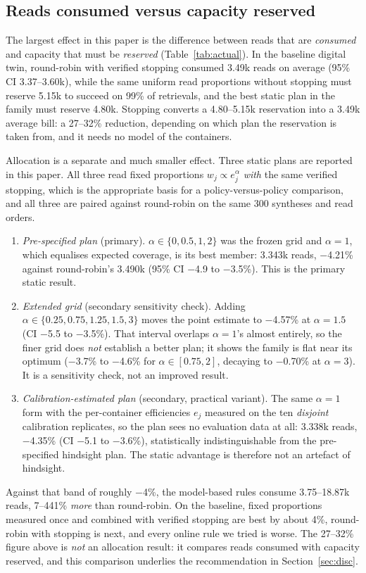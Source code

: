 \documentclass[conference,onecolumn,11pt]{IEEEtran}
\begin{document}
\subsection{Reads consumed versus capacity reserved}\label{sec:res-actual}

The largest effect in this paper is the difference between reads that are \emph{consumed} and capacity
that must be \emph{reserved} (Table~\ref{tab:actual}).  In the baseline digital twin, round-robin with verified stopping consumed
3.49k reads on average (95\% CI 3.37--3.60k), while the same uniform read proportions without stopping
must reserve 5.15k to succeed on 99\% of retrievals, and the best static plan in the family must
reserve 4.80k.  Stopping converts a 4.80--5.15k reservation into a 3.49k average bill: a 27--32\%
reduction, depending on which plan the reservation is taken from, and it needs no model of the
containers.

Allocation is a separate and much smaller effect.  Three static plans are reported in this paper.  All
three read fixed proportions $w_j\propto e_j^{\alpha}$ \emph{with} the same verified stopping, which is
the appropriate basis for a policy-versus-policy comparison, and all three are paired against
round-robin on the same 300 syntheses and read orders.
\begin{enumerate}
\item \emph{Pre-specified plan} (primary).  $\alpha\in\{0,0.5,1,2\}$ was the frozen grid and $\alpha{=}1$,
which equalises expected coverage, is its best member: 3.343k reads, $-$4.21\% against round-robin's
3.490k (95\% CI $-$4.9 to $-$3.5\%).  This is the primary static result.
\item \emph{Extended grid} (secondary sensitivity check).  Adding $\alpha\in\{0.25,0.75,1.25,1.5,3\}$
moves the point estimate to $-$4.57\% at $\alpha{=}1.5$ (CI $-$5.5 to $-$3.5\%).  That interval overlaps
$\alpha{=}1$'s almost entirely, so the finer grid does \emph{not} establish a better plan; it shows the
family is flat near its optimum ($-$3.7\% to $-$4.6\% for $\alpha\in[0.75,2]$, decaying to $-$0.70\% at
$\alpha{=}3$).  It is a sensitivity check, not an improved result.
\item \emph{Calibration-estimated plan} (secondary, practical variant).  The same $\alpha{=}1$ form with
the per-container efficiencies $e_j$ measured on the ten \emph{disjoint} calibration replicates, so the
plan sees no evaluation data at all: 3.338k reads, $-$4.35\% (CI $-$5.1 to $-$3.6\%), statistically
indistinguishable from the pre-specified hindsight plan.  The static advantage is therefore not an
artefact of hindsight.
\end{enumerate}
Against that band of roughly $-$4\%, the model-based rules consume 3.75--18.87k reads, 7--441\%
\emph{more} than round-robin.  On the baseline, fixed proportions measured once and combined with
verified stopping are best by about 4\%, round-robin with stopping is next, and every online rule we
tried is worse.  The 27--32\% figure above is \emph{not} an allocation result: it compares reads
consumed with capacity reserved, and this comparison underlies the recommendation in
Section~\ref{sec:disc}.
\end{document}
